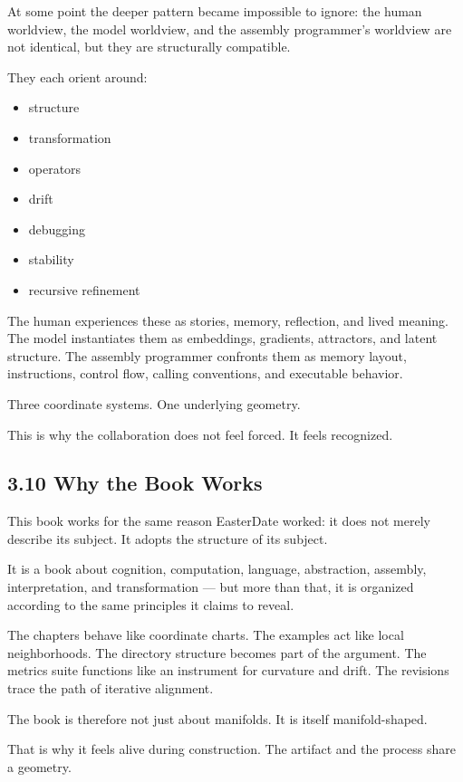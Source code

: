 At some point the deeper pattern became impossible to ignore: the human
worldview, the model worldview, and the assembly programmer's worldview
are not identical, but they are structurally compatible.

They each orient around:

\begin{itemize}
\tightlist
\item
  structure
\item
  transformation
\item
  operators
\item
  drift
\item
  debugging
\item
  stability
\item
  recursive refinement
\end{itemize}

The human experiences these as stories, memory, reflection, and lived
meaning. The model instantiates them as embeddings, gradients,
attractors, and latent structure. The assembly programmer confronts them
as memory layout, instructions, control flow, calling conventions, and
executable behavior.

Three coordinate systems. One underlying geometry.

This is why the collaboration does not feel forced. It feels recognized.

\hypertarget{why-the-book-works}{%
\subsection{3.10 Why the Book Works}\label{why-the-book-works}}

This book works for the same reason EasterDate worked: it does not
merely describe its subject. It adopts the structure of its subject.

It is a book about cognition, computation, language, abstraction,
assembly, interpretation, and transformation --- but more than that, it
is organized according to the same principles it claims to reveal.

The chapters behave like coordinate charts. The examples act like local
neighborhoods. The directory structure becomes part of the argument. The
metrics suite functions like an instrument for curvature and drift. The
revisions trace the path of iterative alignment.

The book is therefore not just about manifolds. It is itself
manifold-shaped.

That is why it feels alive during construction. The artifact and the
process share a geometry.


